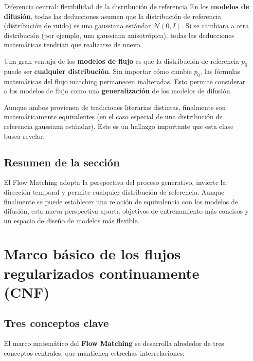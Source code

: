 \documentclass[a4paper]{article}
\begin{document}
\begin{importantbox}{Diferencia central: flexibilidad de la distribución de referencia}
En los \textbf{modelos de difusión}, todas las deducciones asumen que la distribución de referencia (distribución de ruido) es una gaussiana estándar $\mathcal{N}(0, I)$. Si se cambiara a otra distribución (por ejemplo, una gaussiana anisotrópica), todas las deducciones matemáticas tendrían que realizarse de nuevo.

Una gran ventaja de los \textbf{modelos de flujo} es que la distribución de referencia $p_0$ puede ser \textbf{cualquier distribución}. Sin importar cómo cambie $p_0$, las fórmulas matemáticas del flujo matching permanecen inalteradas. Esto permite considerar a los modelos de flujo como una \textbf{generalización} de los modelos de difusión.
\end{importantbox}

Aunque ambos provienen de tradiciones literarias distintas, finalmente son matemáticamente equivalentes (en el caso especial de una distribución de referencia gaussiana estándar). Este es un hallazgo importante que esta clase busca revelar.

\subsection{Resumen de la sección}

El Flow Matching adopta la perspectiva del proceso generativo, invierte la dirección temporal y permite cualquier distribución de referencia. Aunque finalmente se puede establecer una relación de equivalencia con los modelos de difusión, esta nueva perspectiva aporta objetivos de entrenamiento más concisos y un espacio de diseño de modelos más flexible.
\section{Marco básico de los flujos regularizados continuamente (CNF)}

\subsection{Tres conceptos clave}

El marco matemático del \textbf{Flow Matching} se desarrolla alrededor de tres conceptos centrales, que mantienen estrechas interrelaciones:
\end{document}
